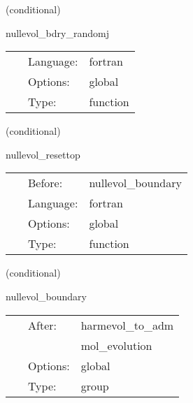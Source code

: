\vspace{5mm}

   (conditional) 

\hspace{5mm} nullevol\_bdry\_randomj 

\hspace{5mm}{\it give random j boundary conditions for the null metric } 


\hspace{5mm}

 \begin{tabular*}{160mm}{cll} 
~ & Language:  & fortran \\ 
~ & Options:  & global \\ 
~ & Type:  & function \\ 
\end{tabular*} 


\vspace{5mm}

   (conditional) 

\hspace{5mm} nullevol\_resettop 

\hspace{5mm}{\it reset top values } 


\hspace{5mm}

 \begin{tabular*}{160mm}{cll} 
~ & Before:  & nullevol\_boundary \\ 
~ & Language:  & fortran \\ 
~ & Options:  & global \\ 
~ & Type:  & function \\ 
\end{tabular*} 


\vspace{5mm}

   (conditional) 

\hspace{5mm} nullevol\_boundary 

\hspace{5mm}{\it boundary data } 


\hspace{5mm}

 \begin{tabular*}{160mm}{cll} 
~ & After:  & harmevol\_to\_adm \\ 
~& ~ &mol\_evolution\\ 
~ & Options:  & global \\ 
~ & Type:  & group \\ 
\end{tabular*} 


